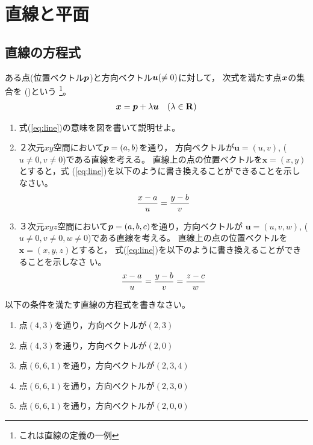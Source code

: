 \documentclass[twocolumn,11pt]{jarticle}
\begin{document}
\section{直線と平面}

\subsection{直線の方程式\label{sec:line}}

ある点(位置ベクトル$\boldsymbol{p}$)と方向ベクトル$\boldsymbol{u}(\ne0)$に対して，
次式を満たす点$\boldsymbol{x}$の集合を
()という
\footnote{これは直線の定義の一例}。
\begin{align}
  \boldsymbol{x}=\boldsymbol{p}+\lambda \boldsymbol{u}\quad(\lambda\in \mathrm{\mathbf{R}})
\label{eq:line}
\end{align}

\question
\begin{enumerate}
\item 式(\ref{eq:line})の意味を図を書いて説明せよ。
\item ２次元$xy$空間において$\boldsymbol{p}=(a,b)$を通り，
  方向ベクトルが$\boldsymbol{u}=(u,v)$, ($u\ne 0,v\ne 0$)である直線を考える。
  直線上の点の位置ベクトルを$\boldsymbol{x}=(x,y)$とすると，式
  (\ref{eq:line})を以下のように書き換えることができることを示しなさい。
  \begin{align}
    \frac{x-a}{u}=\frac{y-b}{v}\notag
  \end{align}
\item ３次元$xyz$空間において$\boldsymbol{p}=(a,b,c)$を通り，方向ベクトルが
  $\boldsymbol{u}=(u,v,w)$, ($u\ne 0,v\ne 0, w\ne 0$)である直線を考える。
  直線上の点の位置ベクトルを$\boldsymbol{x}=(x,y,z)$とすると，
  式(\ref{eq:line})を以下のように書き換えることができることを示しなさ
  い。
  \begin{align}
    \frac{x-a}{u}=\frac{y-b}{v}=\frac{z-c}{w}\notag
  \end{align}
\end{enumerate}

\exercise
以下の条件を満たす直線の方程式を書きなさい。
\begin{enumerate}
\item 点$(4,3)$を通り，方向ベクトルが$(2,3)$
\item 点$(4,3)$を通り，方向ベクトルが$(2,0)$
\item 点$(6,6,1)$を通り，方向ベクトルが$(2,3,4)$
\item 点$(6,6,1)$を通り，方向ベクトルが$(2,3,0)$
\item 点$(6,6,1)$を通り，方向ベクトルが$(2,0,0)$
\end{enumerate}
\end{document}
